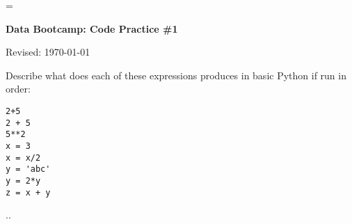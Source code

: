\documentclass[11pt]{exam}
\begin{document}
\parskip=\bigskipamount
\parindent=0.0in
\thispagestyle{empty}


\bigskip\bigskip
\centerline{\Large \bf Data Bootcamp:  Code Practice \#1}
\centerline{Revised: \today}

\begin{questions}
\item Describe what does each of these expressions produces in basic Python if run in order:
\begin{verbatim}
2+5
2 + 5
5**2
x = 3
x = x/2
y = 'abc'
y = 2*y
z = x + y
\end{verbatim}

\item ..

\end{questions}


\end{document}
